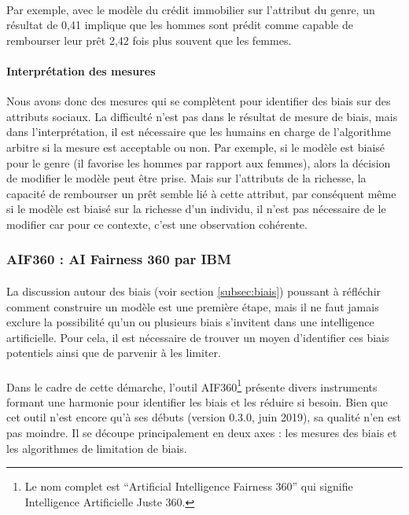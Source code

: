 \documentclass[10pt, french, a4paper]{report}
\begin{document}
\paragraph{}
Par exemple, avec le modèle du crédit immobilier sur l'attribut du genre, un résultat de 0,41 implique que les hommes sont prédit comme capable de rembourser leur prêt 2,42 fois plus souvent que les femmes.

\paragraph{Interprétation des mesures} Nous avons donc des mesures qui se complètent pour identifier des biais sur des attributs sociaux. La difficulté n'est pas dans le résultat de mesure de biais, mais dans l'interprétation, il est nécessaire que les humains en charge de l'algorithme arbitre si la mesure est acceptable ou non. Par exemple, si le modèle est biaisé pour le genre (il favorise les hommes par rapport aux femmes), alors la décision de modifier le modèle peut être prise. Mais sur l'attributs de la richesse, la capacité de rembourser un prêt semble lié à cette attribut, par conséquent même si le modèle est biaisé sur la richesse d'un individu, il n'est pas nécessaire de le modifier car pour ce contexte, c'est une observation cohérente.

\subsubsection{AIF360 : AI Fairness 360 par IBM}

\paragraph{}
La discussion autour des biais (voir section \ref{subsec:biais}) poussant à réfléchir comment construire un modèle est une première étape, mais il ne faut jamais exclure la possibilité qu’un ou plusieurs biais s’invitent dans une intelligence artificielle. Pour cela, il est nécessaire de trouver un moyen d’identifier ces biais potentiels ainsi que de parvenir à les limiter.

\paragraph{}
Dans le cadre de cette démarche, l’outil AIF360\footnote{Le nom complet est ``Artificial Intelligence Fairness 360'' qui signifie Intelligence Artificielle Juste 360.} \citep{bellamy_ai_2018} présente divers instruments formant une harmonie pour identifier les biais et les réduire si besoin. Bien que cet outil n’est encore qu’à ses débuts (version 0.3.0, juin 2019), sa qualité n’en est pas moindre. Il se découpe principalement en deux axes : les mesures des biais et les algorithmes de limitation de biais.
\end{document}
